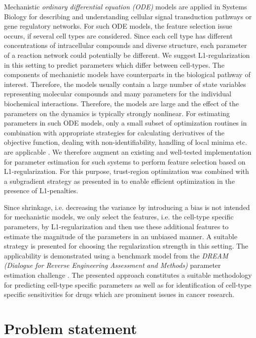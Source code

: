 \documentclass{bioinfo}
\begin{document}
Mechanistic  \emph{ordinary differential equation (ODE)} models are applied in Systems Biology for describing and understanding cellular signal transduction pathways or gene regulatory networks. 
For such ODE models, the feature selection issue occurs, if several cell types are considered. 
Since each cell type has different concentrations of intracellular compounds and diverse structure, each parameter of a reaction network could potentially be different. 
We suggest L1-regularization in this setting to predict parameters which differ between cell-types.
The components of mechanistic models have counterparts in the biological pathway of interest. 
Therefore, the models usually contain a large number of state variables representing molecular compounds and many parameters for the individual biochemical interactions. 
Therefore, the models are large and the effect of the parameters on the dynamics is typically strongly nonlinear. 
For estimating parameters in such ODE models, only a small subset of optimization routines in combination with appropriate strategies for calculating derivatives of the objective function, dealing with non-identifiability, handling of local minima etc. are applicable \citep{Raue2013}. 
We therefore augment an existing and well-tested implementation for parameter estimation for such systems \citep{Raue2015} to perform feature selection based on L1-regularization. 
For this purpose, trust-region optimization \citep{Coleman96} was combined with a subgradient strategy as presented in \citep{Schmidt09} to enable efficient optimization in the presence of L1-penalties. 

Since shrinkage, i.e. decreasing the variance by introducing a bias is not intended for mechanistic models, we only select the features, i.e. the cell-type specific parameters, by L1-regularization and then use these additional features to estimate the magnitude of the parameters in an unbiased manner. 
A suitable strategy is presented for choosing the regularization strength in this setting. 
The applicability is demonstrated using a benchmark model from the \emph{DREAM (Dialogue for Reverse Engineering Assessment and Methods)} parameter estimation challenge \citep{Steiert12}. 
The presented approach constitutes a suitable methodology for predicting cell-type specific parameters as well as for identification of cell-type specific sensitivities for drugs which are prominent issues in cancer research.

\section{Problem statement}
\end{document}
